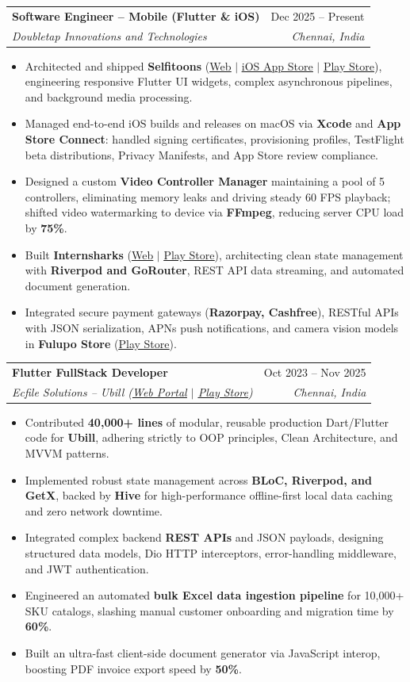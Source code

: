 \documentclass[letterpaper,10pt]{article}
\makeatletter
\newcommand{\resumeItem}[1]{
  \item\small{
    {#1 \vspace{-2pt}}
  }
}
\newcommand{\resumeSubheading}[4]{
  \vspace{-2pt}\item
    \begin{tabular*}{0.97\textwidth}[t]{l@{\extracolsep{\fill}}r}
      \textbf{#1} & #2 \\
      \textit{\small#3} & \textit{\small #4} \\
    \end{tabular*}\vspace{-6pt}
}
\newcommand{\resumeItemListStart}{\begin{itemize}}
\newcommand{\resumeItemListEnd}{\end{itemize}\vspace{-5pt}}
\makeatother
\begin{document}
    \resumeSubheading
      {Software Engineer -- Mobile (Flutter \& iOS)}{Dec 2025 -- Present}
      {Doubletap Innovations and Technologies}{Chennai, India}
      \resumeItemListStart
        \resumeItem{Architected and shipped \textbf{Selfitoons} (\href{https://selfitoons.ai/}{\underline{Web}} $|$ \href{https://apps.apple.com/in/app/selfitoons/id6758597947}{\underline{iOS App Store}} $|$ \href{https://play.google.com/store/apps/details?id=com.doubletap.ai.selfitoons}{\underline{Play Store}}), engineering responsive Flutter UI widgets, complex asynchronous pipelines, and background media processing.}
        \resumeItem{Managed end-to-end iOS builds and releases on macOS via \textbf{Xcode} and \textbf{App Store Connect}: handled signing certificates, provisioning profiles, TestFlight beta distributions, Privacy Manifests, and App Store review compliance.}
        \resumeItem{Designed a custom \textbf{Video Controller Manager} maintaining a pool of 5 controllers, eliminating memory leaks and driving steady 60 FPS playback; shifted video watermarking to device via \textbf{FFmpeg}, reducing server CPU load by \textbf{75\%}.}
        \resumeItem{Built \textbf{Internsharks} (\href{https://internsharks.ai/}{\underline{Web}} $|$ \href{https://play.google.com/store/apps/details?id=com.doubletap.internsharks.ai}{\underline{Play Store}}), architecting clean state management with \textbf{Riverpod and GoRouter}, REST API data streaming, and automated document generation.}
        \resumeItem{Integrated secure payment gateways (\textbf{Razorpay, Cashfree}), RESTful APIs with JSON serialization, APNs push notifications, and camera vision models in \textbf{Fulupo Store} (\href{https://play.google.com/store/apps/details?id=com.doubletap.fulupostore}{\underline{Play Store}}).}
      \resumeItemListEnd

    \resumeSubheading
      {Flutter FullStack Developer}{Oct 2023 -- Nov 2025}
      {Ecfile Solutions -- Ubill (\href{https://app.ubill.tech/}{\underline{Web Portal}} $|$ \href{https://play.google.com/store/apps/details?id=com.ubill.tech}{\underline{Play Store}})}{Chennai, India}
      \resumeItemListStart
        \resumeItem{Contributed \textbf{40,000+ lines} of modular, reusable production Dart/Flutter code for \textbf{Ubill}, adhering strictly to OOP principles, Clean Architecture, and MVVM patterns.}
        \resumeItem{Implemented robust state management across \textbf{BLoC, Riverpod, and GetX}, backed by \textbf{Hive} for high-performance offline-first local data caching and zero network downtime.}
        \resumeItem{Integrated complex backend \textbf{REST APIs} and JSON payloads, designing structured data models, Dio HTTP interceptors, error-handling middleware, and JWT authentication.}
        \resumeItem{Engineered an automated \textbf{bulk Excel data ingestion pipeline} for 10,000+ SKU catalogs, slashing manual customer onboarding and migration time by \textbf{60\%}.}
        \resumeItem{Built an ultra-fast client-side document generator via JavaScript interop, boosting PDF invoice export speed by \textbf{50\%}.}
      \resumeItemListEnd
\end{document}
